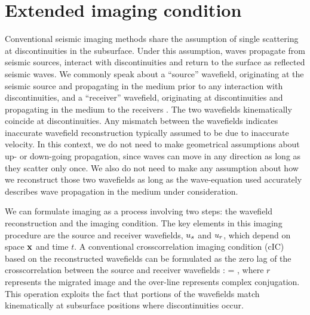 \section{Extended imaging condition}

Conventional seismic imaging methods share the assumption of single scattering at discontinuities in the subsurface.  Under this assumption, waves propagate from seismic sources, interact with discontinuities and return to the surface as reflected seismic waves. We commonly speak about a ``source'' wavefield, originating at the seismic source and propagating in the medium prior to any interaction with discontinuities, and a ``receiver'' wavefield, originating at discontinuities and propagating in the medium to the receivers \cite[]{Berkhout.1982,Claerbout.iei}. The two wavefields kinematically coincide at discontinuities. Any mismatch between the wavefields indicates inaccurate wavefield reconstruction typically assumed to be due to inaccurate velocity. In this context, we do not need to make geometrical assumptions about up- or down-going propagation, since waves can move in any direction as long as they scatter only once. We also do not need to make any assumption about how we reconstruct those two wavefields as long as the wave-equation used accurately describes wave propagation in the medium under consideration.

We can formulate imaging as a process involving two steps: the wavefield reconstruction and the imaging condition. The key elements in this imaging procedure are the source and receiver wavefields, ${{u}_s}$ and ${{u}_r}$, which depend on space ${\bf x}$ and time $t$.  A conventional crosscorrelation imaging condition (cIC) based on the reconstructed wavefields can be formulated as the zero lag of the crosscorrelation between the source and receiver wavefields \cite[]{Claerbout.iei}:
%
\beq
\label{eqn:CICw}
\RR \ofx =  \esum{\ww}
\CONJ{ \USw \ofxw }
       \URw \ofxw ,
\eeq
%
where ${r}$ represents the migrated image and the over-line represents complex conjugation. This operation exploits the fact that portions of the wavefields match kinematically at subsurface positions where discontinuities occur.

